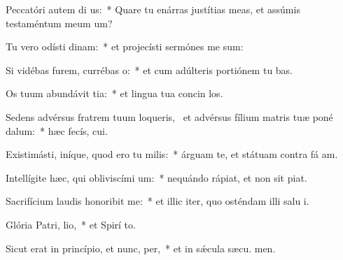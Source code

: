\item Peccatóri autem di us:~* Quare tu enárras justítias meas, et assúmis testaméntum meum   um?
\item Tu vero odísti dinam:~* et projecísti sermónes me sum:
\item Si vidébas furem, currébas  o:~* et cum adúlteris portiónem tu bas.
\item Os tuum abundávit tia:~* et lingua tua concin los.
\item Sedens advérsus fratrem tuum loqueris,~\pscross{} et advérsus fílium matris tuæ poné dalum:~* hæc fecís,  cui.
\item Existimásti, iníque, quod ero tu milis:~* árguam te, et státuam contra fá am.
\item Intellígite hæc, qui obliviscími um:~* nequándo rápiat, et non sit  piat.
\item Sacrifícium laudis honoribit me:~* et illic iter, quo osténdam illi salu i.
\item Glória Patri,  lio,~* et Spirí to.
\item Sicut erat in princípio, et nunc,  per,~* et in sǽcula sæcu. men.
